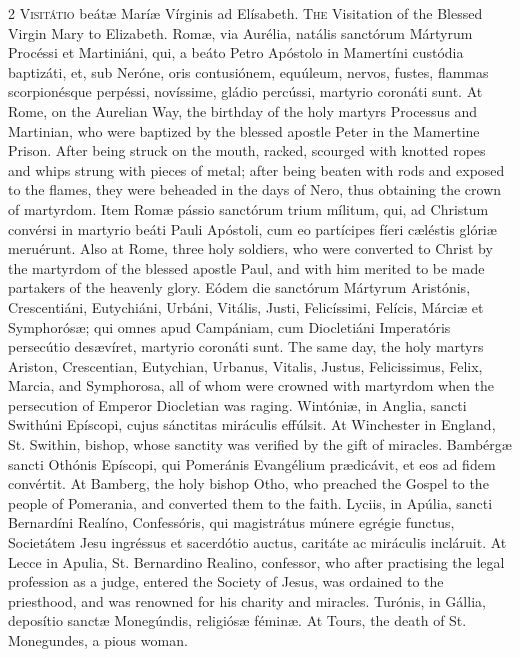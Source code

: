 \begin{paracol}{2}
\lettrine[lines=2]{V}{isitátio} beátæ Maríæ 
 Vírginis ad Elísabeth.
\switchcolumn
{}
\lettrine[lines=2]{T}{he} Visitation of the Blessed Virgin 
 Mary to Elizabeth.
\switchcolumn*
{}
Romæ, via Aurélia, natális sanctórum Mártyrum Procéssi et Martiniáni, qui, a beáto Petro 
 Apóstolo in Mamertíni custódia baptizáti, et, sub Neróne, oris contusiónem, 
 equúleum, nervos, fustes, flammas scorpionésque perpéssi, novíssime, gládio 
 percússi, martyrio coronáti sunt.
\switchcolumn
{}
At Rome, on the Aurelian Way, the 
 birthday of the holy martyrs Processus and Martinian, who were baptized by 
 the blessed apostle Peter in the Mamertine Prison. After being struck 
 on the mouth, racked, scourged with knotted ropes and whips strung with 
 pieces of metal; after being beaten with rods and exposed to the flames, 
 they were beheaded in the days of Nero, thus obtaining the crown of 
 martyrdom.
\switchcolumn*
{}
Item Romæ pássio 
 sanctórum trium mílitum, qui, ad Christum convérsi in martyrio beáti Pauli 
 Apóstoli, cum eo partícipes fíeri cæléstis glóriæ meruérunt.
\switchcolumn
{}
Also at Rome, three holy soldiers, 
 who were converted to Christ by the martyrdom of the blessed apostle Paul, 
 and with him merited to be made partakers of the heavenly glory.
\switchcolumn*
{}
Eódem die sanctórum 
 Mártyrum Aristónis, Crescentiáni, Eutychiáni, Urbáni, Vitális, Justi, 
 Felicíssimi, Felícis, Márciæ et Symphorósæ; qui omnes apud Campániam, cum 
 Diocletiáni Imperatóris persecútio desævíret, martyrio coronáti sunt.
\switchcolumn
{}
The same day, the holy martyrs 
 Ariston, Crescentian, Eutychian, Urbanus, Vitalis, Justus, Felicissimus, 
 Felix, Marcia, and Symphorosa, all of whom were crowned with martyrdom when 
 the persecution of Emperor Diocletian was raging.
\switchcolumn*
{}
Wintóniæ, in Anglia, 
 sancti Swithúni Epíscopi, cujus sánctitas miráculis effúlsit.
\switchcolumn
{}
At Winchester in England, St. 
 Swithin, bishop, whose sanctity was verified by the gift of miracles.
\switchcolumn*
{}
Bambérgæ sancti Othónis 
 Epíscopi, qui Pomeránis Evangélium prædicávit, et eos ad fidem convértit.
\switchcolumn
{}
At Bamberg, the holy bishop Otho, 
 who preached the Gospel to the people of Pomerania, and converted them to 
 the faith.
\switchcolumn*
{}
Lyciis, in Apúlia, sancti Bernardíni Realíno, Confessóris, qui magistrátus múnere egrégie 
 functus, Societátem Jesu ingréssus et sacerdótio auctus, caritáte ac 
 miráculis incláruit.
\switchcolumn
{}
At Lecce in Apulia, St. Bernardino 
 Realino, confessor, who after practising the legal profession as a judge, 
 entered the Society of Jesus, was ordained to the priesthood, and was 
 renowned for his charity and miracles.
\switchcolumn*
{}
Turónis, in Gállia, 
 deposítio sanctæ Monegúndis, religiósæ féminæ.
\switchcolumn
{}
At Tours, the death of St. 
 Monegundes, a pious woman.
\switchcolumn*
{}
\end{paracol}


